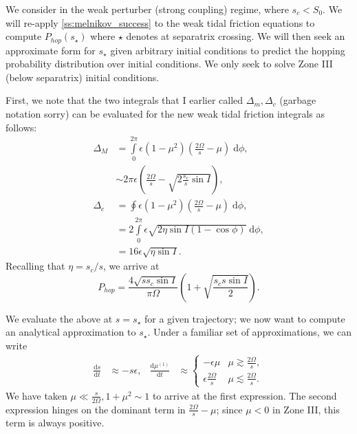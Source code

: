 \documentclass[11pt,
        usenames, %
        dvipsnames %
    ]{article}
\newcommand*{\rd}[2]{\frac{\mathrm{d}#1}{\mathrm{d}#2}}
\newcommand*{\p}[1]{\left(#1\right)}
\begin{document}
We consider in the weak perturber (strong coupling) regime, where $s_c < S_0$.
We will re-apply \autoref{ss:melnikov_success} to the weak tidal friction
equations to compute $P_{hop}(s_\star)$ where $\star$ denotes at separatrix
crossing. We will then seek an approximate form for $s_{\star}$ given arbitrary
initial conditions to predict the hopping probability distribution over initial
conditions. We only seek to solve Zone III (below separatrix) initial
conditions.

First, we note that the two integrals that I earlier called $\Delta_m, \Delta_c$
(garbage notation sorry) can be evaluated for the new weak tidal friction
integrals as follows:
\begin{align}
    \Delta_M &= \int\limits_0^{2\pi}\epsilon\p{1 - \mu^2}
            \p{\frac{2\Omega}{s} - \mu} \;\mathrm{d}\phi,\nonumber\\
        &\sim 2\pi \epsilon \p{\frac{2\Omega}{s}
            - \sqrt{2\frac{s_c}{s}\sin I}},\\
    \Delta_c &= \oint \epsilon \p{1 - \mu^2}\p{\frac{2\Omega}{s} - \mu}
            \;\mathrm{d}\phi,\nonumber\\
        &= 2\int\limits_0^{2\pi}
            \epsilon\sqrt{2\eta \sin I\p{1 - \cos \phi}}\;\mathrm{d}\phi
            ,\nonumber\\
        &= 16\epsilon\sqrt{\eta \sin I}.
\end{align}
Recalling that $\eta = s_c/s$, we arrive at
\begin{equation}
    P_{hop} = \frac{4\sqrt{ss_c\sin I}}{\pi \Omega}
        \p{1 + \sqrt{\frac{s_cs\sin I}{2}}}.\label{eq:p_hop_sqrt_s}
\end{equation}

We evaluate the above at $s = s_\star$ for a given trajectory; we now want to
compute an analytical approximation to $s_\star$. Under a familiar set of
approximations, we can write
\begin{align*}
    \rd{s}{t} &\approx -s\epsilon,&
    \rd{\mu^{(1)}}{t} &\approx
    \begin{cases}
        -\epsilon\mu & \mu \gtrsim \frac{2\Omega}{s},\\
        \epsilon\frac{2\Omega}{s} & \mu \lesssim \frac{2\Omega}{s}.
    \end{cases}
\end{align*}
We have taken $\mu \ll \frac{s}{2\Omega}, 1 + \mu^2 \sim 1$ to arrive at the
first expression. The second expression hinges on the dominant term in
$\frac{2\Omega}{s} - \mu$; since $\mu < 0$ in Zone III, this term is always
positive.
\end{document}
